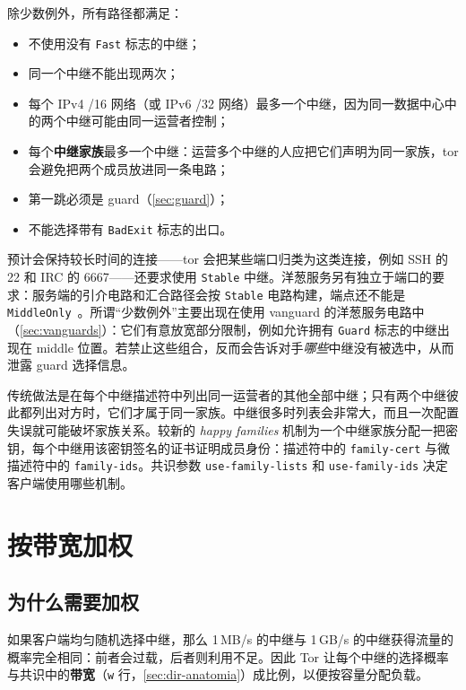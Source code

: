 除少数例外，所有路径都满足：
\begin{itemize}
  \item 不使用没有 \texttt{Fast} 标志的中继；
  \item 同一个中继不能出现两次；
  \item 每个 IPv4 /16 网络（或 IPv6 /32 网络）最多一个中继，因为同一数据中心中的两个中继可能由同一运营者控制；
  \item 每个\textbf{中继家族}最多一个中继：运营多个中继的人应把它们声明为同一家族，tor 会避免把两个成员放进同一条电路；
  \item 第一跳必须是 guard（\cref{sec:guard}）；
  \item 不能选择带有 \texttt{BadExit} 标志的出口。
\end{itemize}
预计会保持较长时间的连接——tor 会把某些端口归类为这类连接，例如 SSH 的 22 和 IRC 的 6667——还要求使用 \texttt{Stable} 中继。洋葱服务另有独立于端口的要求：服务端的引介电路和汇合路径会按 \texttt{Stable} 电路构建，端点还不能是 \texttt{MiddleOnly}~。所谓“少数例外”主要出现在使用 vanguard 的洋葱服务电路中（\cref{sec:vanguards}）：它们有意放宽部分限制，例如允许拥有 \texttt{Guard} 标志的中继出现在 middle 位置。若禁止这些组合，反而会告诉对手\emph{哪些}中继没有被选中，从而泄露 guard 选择信息。

\begin{approfondimento}[两种声明中继家族的方式]
传统做法是在每个中继描述符中列出同一运营者的其他全部中继；只有两个中继彼此都列出对方时，它们才属于同一家族。中继很多时列表会非常大，而且一次配置失误就可能破坏家族关系。较新的 \emph{happy families} 机制为一个中继家族分配一把密钥，每个中继用该密钥签名的证书证明成员身份：描述符中的 \texttt{family-cert} 与微描述符中的 \texttt{family-ids}。共识参数 \texttt{use-family-lists} 和 \texttt{use-family-ids} 决定客户端使用哪些机制。
\end{approfondimento}

\section{按带宽加权}\label{sec:percorso-pesi}

\subsection{为什么需要加权}

如果客户端均匀随机选择中继，那么 1\,MB/s 的中继与 1\,GB/s 的中继获得流量的概率完全相同：前者会过载，后者则利用不足。因此 Tor 让每个中继的选择概率与共识中的\textbf{带宽}（\texttt{w} 行，\cref{sec:dir-anatomia}）成比例，以便按容量分配负载。

